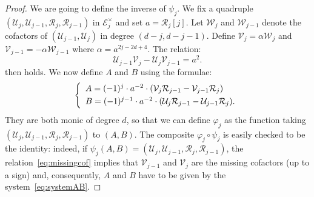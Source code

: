 \documentclass{jT}
\numberwithin{equation}{section}
\theoremstyle{definition}
\begin{document}
\begin{proof} 
We are going to define the inverse of $\psi_j$. We fix a quadruple 
$(\mathcal U_j, \mathcal U_{j-1}, \mathcal R_j, \mathcal R_{j-1})$ in 
$\mathcal E_j^\times$ and set $a = \mathcal R_j[j]$.
Let $\mathcal W_j$ and $\mathcal W_{j-1}$ denote 
the cofactors of $(\mathcal U_{j-1}, \mathcal U_j)$ in degree 
$(d{-}j, d{-}j{-}1)$. Define $\mathcal V_j = \alpha \mathcal W_j$ and 
$\mathcal V_{j-1} = -\alpha \mathcal W_{j-1}$ where $\alpha =
a^{2j-2d+4}$. The relation:
\begin{equation}
\label{eq:missingcof}
\mathcal U_{j-1} \mathcal V_j - 
\mathcal U_j \mathcal V_{j-1} = a^2.
\end{equation}
then holds. We now define $A$ and $B$ using the formulae:
\begin{equation}
\label{eq:systemAB}
\left\{\begin{array}{l}
A = (-1)^j \cdot a^{-2} \cdot (\mathcal V_j \mathcal R_{j-1} - \mathcal V_{j-1} \mathcal R_j) \smallskip \\
B = (-1)^{j-1} \cdot a^{-2} \cdot (\mathcal U_j \mathcal R_{j-1} - \mathcal U_{j-1} \mathcal R_j). \\
\end{array}\right.
\end{equation}
They are both monic of degree $d$, so that we can define $\varphi_j$
as the function taking $(\mathcal U_j, \mathcal 
U_{j-1}, \mathcal R_j, \mathcal R_{j-1})$ to $(A,B)$. The composite 
$\varphi_j \circ \psi_j$ is easily checked to be the identity: indeed, 
if $\psi_j(A,B) = (\mathcal U_j, \mathcal U_{j-1}, \mathcal R_j, 
\mathcal R_{j-1})$, the relation~\eqref{eq:missingcof} implies that 
$\mathcal V_{j-1}$ and $\mathcal V_j$ are the missing cofactors (up 
to a sign) and, consequently, $A$ and $B$ have to be given by the 
system~\eqref{eq:systemAB}.


\end{proof}
\end{document}
